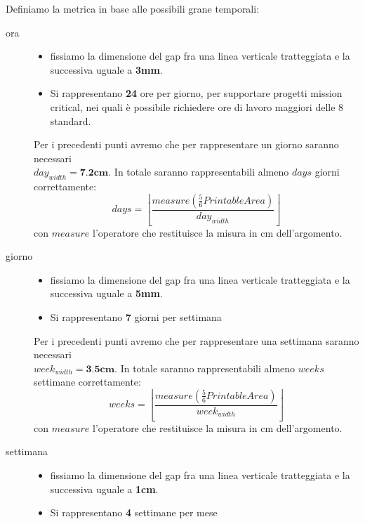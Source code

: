 Definiamo la metrica in base alle possibili grane temporali:
\begin{description}
\item[ora] \quad
\begin{itemize}
  \item fissiamo la dimensione del gap fra una linea verticale tratteggiata
e la successiva uguale a \textbf{3mm}.
  \item Si rappresentano \textbf{24} ore per giorno, per supportare progetti
  mission critical, nei quali \`e possibile richiedere ore di lavoro maggiori delle 8 
standard.
\end{itemize}

Per i precedenti punti avremo che per rappresentare un giorno saranno
necessari\\ $day_{width} = \textbf{7.2cm}$. In totale saranno rappresentabili 
almeno $days$ giorni correttamente:
\begin{displaymath}
	days = \left \lfloor \frac{measure \left (\frac{5}{6}PrintableArea
	\right)}{day_{width}}\right \rfloor
\end{displaymath}
con $measure$ l'operatore che restituisce la misura in cm dell'argomento.

\item[giorno] \quad
\begin{itemize}
  \item fissiamo la dimensione del gap fra una linea verticale tratteggiata
e la successiva uguale a \textbf{5mm}.
  \item Si rappresentano \textbf{7} giorni per settimana
\end{itemize}

Per i precedenti punti avremo che per rappresentare una settimana saranno
necessari\\ $week_{width} = \textbf{3.5cm}$. In totale saranno rappresentabili 
almeno $weeks$ settimane correttamente:
\begin{displaymath}
	weeks = \left \lfloor \frac{measure \left (\frac{5}{6}PrintableArea
	\right)}{week_{width}}\right \rfloor
\end{displaymath}
con $measure$ l'operatore che restituisce la misura in cm dell'argomento.

\item[settimana] \quad
\begin{itemize}
  \item fissiamo la dimensione del gap fra una linea verticale tratteggiata
e la successiva uguale a \textbf{1cm}.
  \item Si rappresentano \textbf{4} settimane per mese
\end{itemize}


\end{description}
